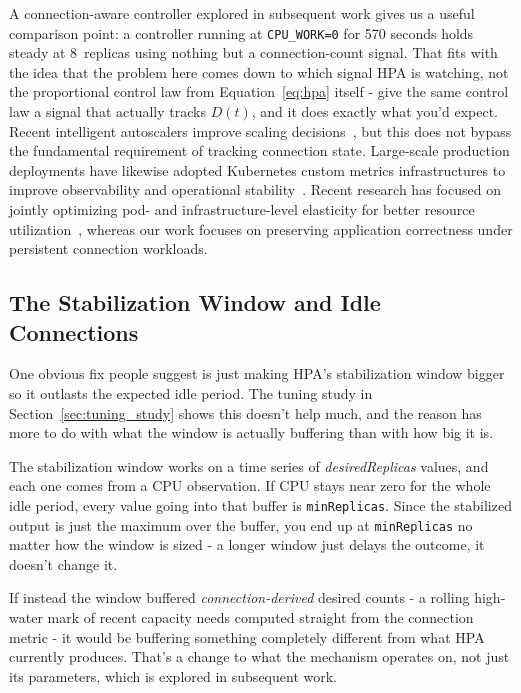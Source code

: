 \documentclass[twocolumn]{svjour3}
\begin{document}
A connection-aware controller explored in subsequent work gives us a useful comparison point: a controller running at
\texttt{CPU\_WORK=0} for 570 seconds holds steady at 8~replicas using nothing but a
connection-count signal. That fits with the idea that the problem here comes down
to which signal HPA is watching, not the proportional control law from Equation~\ref{eq:hpa} itself - give
the same control law a signal that actually tracks $D(t)$, and it does exactly what
you'd expect. Recent intelligent autoscalers improve scaling decisions~\cite{khaleq2023intelligent}, but this does not bypass the fundamental requirement of tracking connection state. Large-scale production deployments have likewise adopted Kubernetes custom metrics infrastructures to improve observability and operational stability~\cite{tedeschi2021cmsweb}. Recent research has focused on jointly optimizing pod- and infrastructure-level elasticity for better resource utilization~\cite{entrialgo2024joint}, whereas our work focuses on preserving application correctness under persistent connection workloads.

\subsection{The Stabilization Window and Idle Connections}

One obvious fix people suggest is just making HPA's stabilization window bigger so
it outlasts the expected idle period. The tuning study in
Section~\ref{sec:tuning_study} shows this doesn't help much, and the reason has
more to do with what the window is actually buffering than with how big it is.

The stabilization window works on a time series of \textit{desiredReplicas}
values, and each one comes from a CPU observation. If CPU stays near zero for the
whole idle period, every value going into that buffer is \texttt{minReplicas}.
Since the stabilized output is just the maximum over the buffer, you end up at
\texttt{minReplicas} no matter how the window is sized - a longer window just
delays the outcome, it doesn't change it.

If instead the window buffered \textit{connection-derived} desired counts - a
rolling high-water mark of recent capacity needs computed straight from the
connection metric - it would be buffering something completely different from
what HPA currently produces. That's a change to what the mechanism operates on,
not just its parameters, which is explored in subsequent work.
\end{document}
